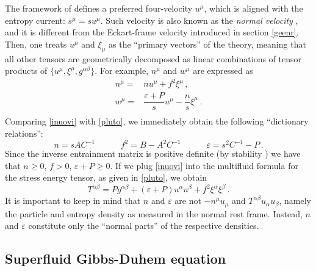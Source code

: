 \documentclass[a4paper, amsfonts, amssymb, amsmath, reprint, showkeys, nofootinbib, twoside, onecolumn, notitlepage]{revtex4-1}
\newcommand{\spc}{\quad \quad \quad}
\begin{document}
The framework of \cite{Son2001,HoloSup2009,Battacharya2011,Bhattacharya2014,
JensenKovtun2012} defines a preferred four-velocity $u^\mu$, which is aligned with the entropy current: $s^\mu =su^\mu$. Such velocity is also known as the \textit{normal velocity} \cite{landau6}, and it is different from the Eckart-frame velocity introduced in section \ref{geenr}. Then, one treats $u^\mu$ and $\xi_\mu$ as the  ``primary vectors'' of the theory, meaning that all other tensors are geometrically decomposed as linear combinations of tensor products of $\{u^\mu, \xi^\mu,g^{\alpha \beta} \}$. For example, $n^\mu$ and $w^\mu$ are expressed as
\begin{equation}\label{inuovi}
\begin{split}
n^\mu ={}& nu^\mu +f^2 \xi^\mu \, ,\\
w^\mu ={}& \dfrac{\varepsilon+P}{s} u^\mu -\dfrac{n}{s} \xi^\mu \, .\\
\end{split}
\end{equation}
Comparing \eqref{inuovi} with \eqref{pluto}, we immediately obtain the following ``dictionary relations'':
\begin{equation}
n= s A C^{-1} \spc f^2=B-A^2 C^{-1} \spc \varepsilon = s^2 C^{-1}-P \, .
\end{equation}
Since the inverse entrainment matrix is positive definite (by stability \cite{GavassinoStabilityCarter2022}) we have that $n \geq 0$, $f>0$, $\varepsilon+P \geq 0$. If we plug \eqref{inuovi} into the multifluid formula for the stress energy tensor, as given in \eqref{pluto}, we obtain
\begin{equation}\label{stressone}
T^{\alpha \beta}=P g^{\alpha \beta} + (\varepsilon +P)u^\alpha u^\beta + f^2 \xi^\alpha \xi^\beta \, .
\end{equation}
It is important to keep in mind that $n$ and $\varepsilon$ are not $-n^\mu u_\mu$ and $T^{\alpha \beta}u_\alpha u_\beta$, namely the particle and entropy density as measured in the normal rest frame. Instead, $n$ and $\varepsilon$ constitute only the ``normal parts'' of the respective densities. 


\subsection{Superfluid Gibbs-Duhem equation}\label{GBBS}
\end{document}
